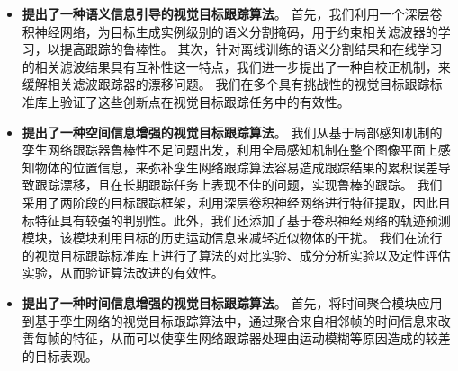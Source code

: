 \begin{itemize}
\item \textbf{提出了一种语义信息引导的视觉目标跟踪算法}。
首先，我们利用一个深层卷积神经网络，为目标生成实例级别的语义分割掩码，用于约束相关滤波器的学习，以提高跟踪的鲁棒性。
其次，针对离线训练的语义分割结果和在线学习的相关滤波结果具有互补性这一特点，我们进一步提出了一种自校正机制，来缓解相关滤波跟踪器的漂移问题。
我们在多个具有挑战性的视觉目标跟踪标准库上验证了这些创新点在视觉目标跟踪任务中的有效性。
\item \textbf{提出了一种空间信息增强的视觉目标跟踪算法}。
我们从基于局部感知机制的孪生网络跟踪器鲁棒性不足问题出发，利用全局感知机制在整个图像平面上感知物体的位置信息，来弥补孪生网络跟踪算法容易造成跟踪结果的累积误差导致跟踪漂移，且在长期跟踪任务上表现不佳的问题，实现鲁棒的跟踪。
我们采用了两阶段的目标跟踪框架，利用深层卷积神经网络进行特征提取，因此目标特征具有较强的判别性。此外，我们还添加了基于卷积神经网络的轨迹预测模块，该模块利用目标的历史运动信息来减轻近似物体的干扰。
我们在流行的视觉目标跟踪标准库上进行了算法的对比实验、成分分析实验以及定性评估实验，从而验证算法改进的有效性。
\item \textbf{提出了一种时间信息增强的视觉目标跟踪算法}。
首先，将时间聚合模块应用到基于孪生网络的视觉目标跟踪算法中，通过聚合来自相邻帧的时间信息来改善每帧的特征，从而可以使孪生网络跟踪器处理由运动模糊等原因造成的较差的目标表观。

\end{itemize}
